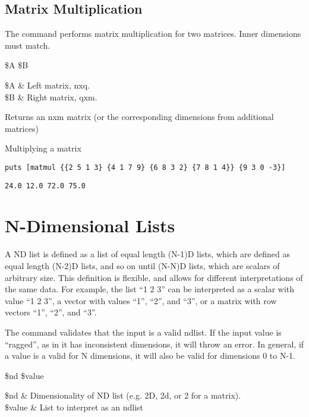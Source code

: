 \documentclass{article}
\begin{document}
\subsection{Matrix Multiplication}
The command  performs matrix multiplication for two matrices.
Inner dimensions must match.
\begin{syntax}
 \$A \$B
\end{syntax}
\begin{args}
\$A & Left matrix, nxq. \\
\$B & Right matrix, qxm. 
\end{args}
Returns an nxm matrix (or the corresponding dimensions from additional matrices)
\begin{example}{Multiplying a matrix}
\begin{lstlisting}
puts [matmul {{2 5 1 3} {4 1 7 9} {6 8 3 2} {7 8 1 4}} {9 3 0 -3}]
\end{lstlisting}
\tcblower
\begin{lstlisting}
24.0 12.0 72.0 75.0
\end{lstlisting}
\end{example}

\clearpage
\section{N-Dimensional Lists}

A ND list is defined as a list of equal length (N-1)D lists, which are defined as equal length (N-2)D lists, and so on until (N-N)D lists, which are scalars of arbitrary size.
This definition is flexible, and allows for different interpretations of the same data. 
For example, the list ``1 2 3'' can be interpreted as a scalar with value ``1 2 3'', a vector with values ``1'', ``2'', and ``3'', or a matrix with row vectors ``1'', ``2'', and ``3''. 


The command  validates that the input is a valid ndlist. 
If the input value is ``ragged'', as in it has inconsistent dimensions, it will throw an error. In general, if a value is a valid for N dimensions, it will also be valid for dimensions 0 to N-1.
\begin{syntax}
 \$nd \$value
\end{syntax}
\begin{args}
\$nd & Dimensionality of ND list (e.g. 2D, 2d, or 2 for a matrix).\\
\$value & List to interpret as an ndlist
\end{args}
\end{document}
